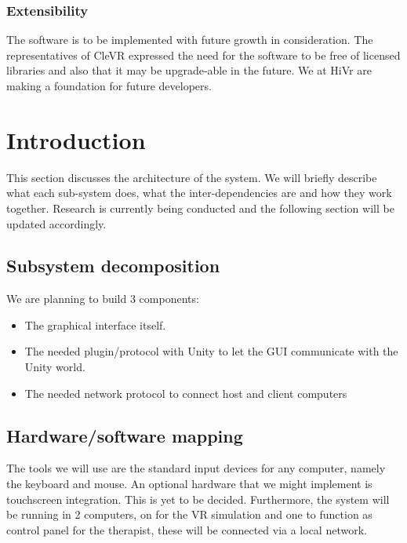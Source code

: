 \documentclass[11pt]{article}
\begin{document}
        \subsubsection{Extensibility}
        The software is to be implemented with future growth in consideration. The representatives of CleVR expressed the need for the software to be free of licensed libraries and also that it may be upgrade-able in the future. We at HiVr are making a foundation for future developers.


\section{Introduction}
This section discusses the architecture of the system. We will briefly describe what each sub-system does, what the inter-dependencies are and how they work together. Research is currently being conducted and the following section will be updated accordingly.

    \subsection{Subsystem decomposition}
    We are planning to build 3 components:
	\begin{itemize}
  		\item The graphical interface itself.
  		\item The needed plugin/protocol with Unity to let the GUI communicate with the Unity world.
        \item The needed network protocol to connect host and client computers
	\end{itemize}   
    
    \subsection{Hardware/software mapping }
    The tools we will use are the standard input devices for any computer, namely the keyboard and mouse. An optional hardware that we might implement is touchscreen integration. This is yet to be decided.
    Furthermore, the system will be running in 2 computers, on for the VR simulation and one to function as control panel for the therapist, these will be connected via a local network.
    
\end{document}

